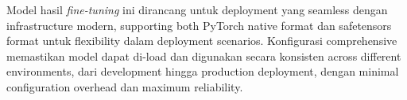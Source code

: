 Model hasil \emph{fine-tuning} ini dirancang untuk deployment yang seamless dengan infrastructure modern, supporting both PyTorch native format dan safetensors format untuk flexibility dalam deployment scenarios. Konfigurasi comprehensive memastikan model dapat di-load dan digunakan secara konsisten across different environments, dari development hingga production deployment, dengan minimal configuration overhead dan maximum reliability.